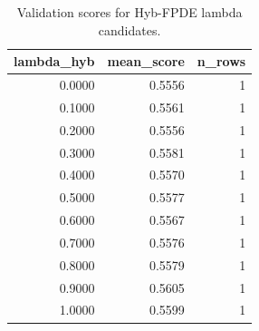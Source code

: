 \begin{table}[t]
\caption{Validation scores for Hyb-FPDE lambda candidates.}
\label{tab:lambda_distribution_computed}
\centering
\begin{tabular}{rrr}
\toprule
lambda\_hyb & mean\_score & n\_rows \\
\midrule
0.0000 & 0.5556 & 1 \\
0.1000 & 0.5561 & 1 \\
0.2000 & 0.5556 & 1 \\
0.3000 & 0.5581 & 1 \\
0.4000 & 0.5570 & 1 \\
0.5000 & 0.5577 & 1 \\
0.6000 & 0.5567 & 1 \\
0.7000 & 0.5576 & 1 \\
0.8000 & 0.5579 & 1 \\
0.9000 & 0.5605 & 1 \\
1.0000 & 0.5599 & 1 \\
\bottomrule
\end{tabular}

\end{table}
